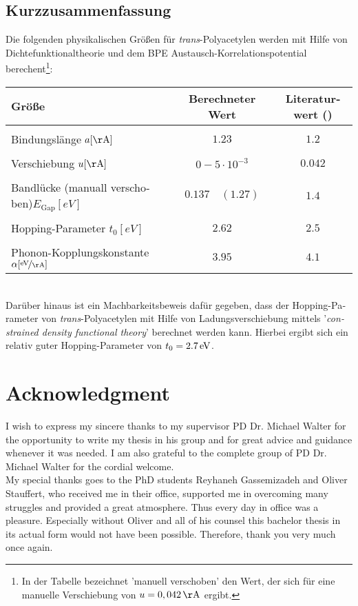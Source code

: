 \begin{otherlanguage}{german}
\chapter*{Kurzzusammenfassung}
	Die folgenden physikalischen Größen für \emph{trans}-Polyacetylen werden mit Hilfe von Dichtefunktionaltheorie und dem BPE Austausch-Korrelationspotential berechent\footnote{In der Tabelle bezeichnet 'manuell verschoben' den Wert, der sich für eine manuelle Verschiebung von \linebreak $u = \unit[0,042]{\AA}$ ergibt.}:
	\begin{table}[!h]
		\centering
		\begin{tabular}{l|c|c}
			Größe & Berechneter Wert & Literaturwert (\cite{PhysRevLett.42.1698, doi:10.1021/cr990357p})\\
			\hline \hline
			&&\\[-.3cm]
			Bindungslänge \hfill$a [\unit{\AA}]$ & $1.23$ & $1.2$\\ \hline&&\\[-.3cm]
			Verschiebung \hfill$u [\unit{\AA}]$& $0 - 5\cdot10^{-3}$ & $0.042$\\ \hline&&\\[-.3cm]
			Bandlücke (manuall verschoben)\hfill$E_\text{Gap} [\unit{eV}]$ & $0.137\quad(1.27)$ & $1.4$\\ \hline &&\\[-.3cm]
			Hopping-Parameter \hfill$t_0 [\unit{eV}]$ & $2.62$ & $2.5$ \\ \hline&&\\[-.3cm]
			Phonon-Kopplungskonstante \hspace*{2cm}$\alpha [\unitfrac{eV}{\AA}]$& $3.95$ & $4.1$
		\end{tabular}
	\end{table}\\
	Darüber hinaus ist ein Machbarkeitsbeweis dafür gegeben, dass der Hopping-Parameter von \emph{trans}-Polyacetylen mit Hilfe von Ladungsverschiebung mittels '\foreignlanguage{english}{\emph{constrained density functional theory}}' berechnet werden kann. Hierbei ergibt sich ein relativ guter Hopping-Parameter von $t_0 = \unit[2.7]{eV}$.
\end{otherlanguage}

\chapter*{Acknowledgment}

I wish to express my sincere thanks to my supervisor PD Dr. Michael Walter for the opportunity to write my thesis in his group and for great advice and guidance whenever it was needed. I am also grateful to the complete group of PD Dr. Michael Walter for the cordial welcome.\\
My special thanks goes to the PhD students Reyhaneh Gassemizadeh and Oliver Stauffert, who received me in their office, supported me in overcoming many struggles and provided a great atmosphere. Thus every day in office was a pleasure. Especially without Oliver and all of his counsel this bachelor thesis in its actual form would not have been possible. Therefore, thank you very much once again.
